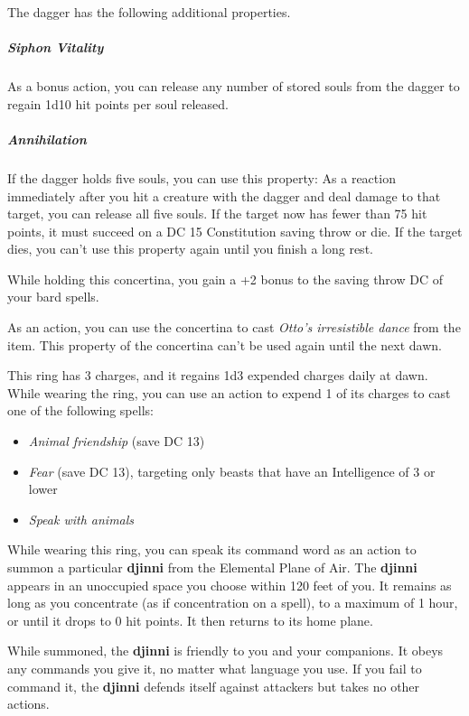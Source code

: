 \documentclass[10pt,a4paper,twoside,bg=print,twocolumn,openany,nodeprecatedcode]{dndbook}
\begin{document}
The dagger has the following additional properties.

\subparagraph{Siphon Vitality}
As a bonus action, you can release any number of stored souls from the dagger to regain 1d10 hit points per soul released.

\subparagraph{Annihilation}
If the dagger holds five souls, you can use this property: As a reaction immediately after you hit a creature with the dagger and deal damage to that target, you can release all five souls. If the target now has fewer than 75 hit points, it must succeed on a DC 15 Constitution saving throw or die. If the target dies, you can't use this property again until you finish a long rest.

While holding this concertina, you gain a +2 bonus to the saving throw DC of your bard spells.

As an action, you can use the concertina to cast \textit{Otto's irresistible dance} from the item. This property of the concertina can't be used again until the next dawn.

This ring has 3 charges, and it regains 1d3 expended charges daily at dawn. While wearing the ring, you can use an action to expend 1 of its charges to cast one of the following spells:


\begin{itemize}
\item \textit{Animal friendship} (save DC 13)
\item \textit{Fear} (save DC 13), targeting only beasts that have an Intelligence of 3 or lower
\item \textit{Speak with animals}
\end{itemize}

While wearing this ring, you can speak its command word as an action to summon a particular \textbf{djinni} from the Elemental Plane of Air. The \textbf{djinni} appears in an unoccupied space you choose within 120 feet of you. It remains as long as you concentrate (as if concentration on a spell), to a maximum of 1 hour, or until it drops to 0 hit points. It then returns to its home plane.

While summoned, the \textbf{djinni} is friendly to you and your companions. It obeys any commands you give it, no matter what language you use. If you fail to command it, the \textbf{djinni} defends itself against attackers but takes no other actions.
\end{document}
